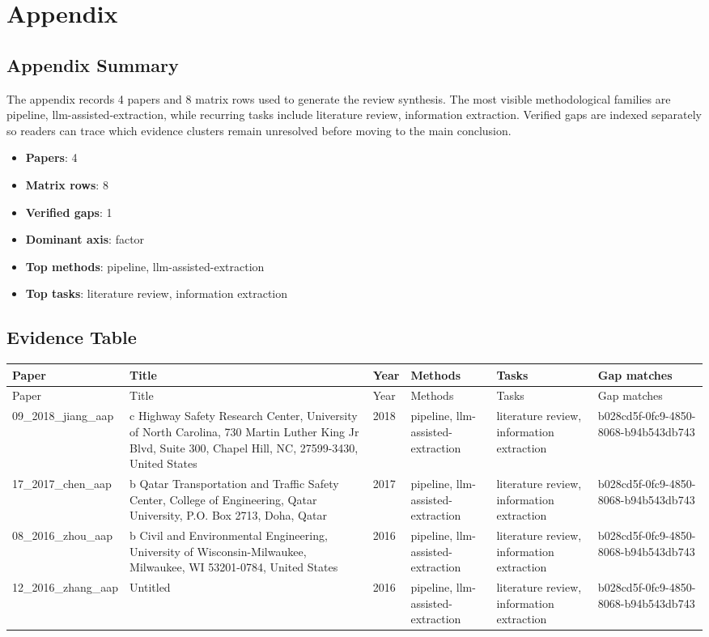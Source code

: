 \documentclass{article}
\begin{document}
\appendix
\section{Appendix}
\subsection{Appendix Summary}
\noindent The appendix records 4 papers and 8 matrix rows used to generate the review synthesis. The most visible methodological families are pipeline, llm-assisted-extraction, while recurring tasks include literature review, information extraction. Verified gaps are indexed separately so readers can trace which evidence clusters remain unresolved before moving to the main conclusion.

\begin{itemize}
\item \textbf{Papers}: 4
\item \textbf{Matrix rows}: 8
\item \textbf{Verified gaps}: 1
\item \textbf{Dominant axis}: factor
\item \textbf{Top methods}: pipeline, llm-assisted-extraction
\item \textbf{Top tasks}: literature review, information extraction
\end{itemize}

\subsection{Evidence Table}
\begin{longtable}{p{}p{}p{}p{}p{}p{}}
\toprule
Paper & Title & Year & Methods & Tasks & Gap matches \\
\midrule
\endfirsthead
\toprule
Paper & Title & Year & Methods & Tasks & Gap matches \\
\midrule
\endhead
09\_2018\_jiang\_aap & c Highway Safety Research Center, University of North Carolina, 730 Martin Luther King Jr Blvd, Suite 300, Chapel Hill, NC, 27599-3430, United States & 2018 & pipeline, llm-assisted-extraction & literature review, information extraction & b028cd5f-0fc9-4850-8068-b94b543db743 \\
17\_2017\_chen\_aap & b Qatar Transportation and Traﬃc Safety Center, College of Engineering, Qatar University, P.O. Box 2713, Doha, Qatar & 2017 & pipeline, llm-assisted-extraction & literature review, information extraction & b028cd5f-0fc9-4850-8068-b94b543db743 \\
08\_2016\_zhou\_aap & b Civil and Environmental Engineering, University of Wisconsin-Milwaukee, Milwaukee, WI 53201-0784, United States & 2016 & pipeline, llm-assisted-extraction & literature review, information extraction & b028cd5f-0fc9-4850-8068-b94b543db743 \\
12\_2016\_zhang\_aap & Untitled & 2016 & pipeline, llm-assisted-extraction & literature review, information extraction & b028cd5f-0fc9-4850-8068-b94b543db743 \\
\bottomrule
\end{longtable}
\end{document}
